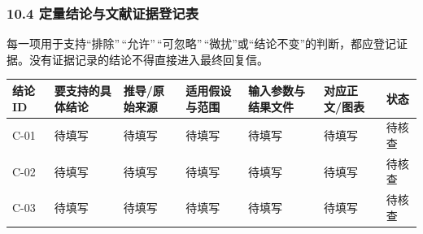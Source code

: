 \documentclass[
  chinese,
  UTF8]{ctexart}
\newcounter{none} %
\begin{document}
\subsubsection{10.4
定量结论与文献证据登记表}\label{ux5b9aux91cfux7ed3ux8bbaux4e0eux6587ux732eux8bc1ux636eux767bux8bb0ux8868}

每一项用于支持``排除''\,``允许''\,``可忽略''\,``微扰''或``结论不变''的判断，都应登记证据。没有证据记录的结论不得直接进入最终回复信。

{\def\LTcaptype{none} %
\begin{longtable}[]{@{}
  >{\raggedright\arraybackslash}p{}
  >{\raggedright\arraybackslash}p{}
  >{\raggedright\arraybackslash}p{}
  >{\raggedright\arraybackslash}p{}
  >{\raggedright\arraybackslash}p{}
  >{\raggedright\arraybackslash}p{}
  >{\raggedright\arraybackslash}p{}@{}}
\toprule\noalign{}
\begin{minipage}[b]{\linewidth}\raggedright
结论 ID
\end{minipage} & \begin{minipage}[b]{\linewidth}\raggedright
要支持的具体结论
\end{minipage} & \begin{minipage}[b]{\linewidth}\raggedright
推导/原始来源
\end{minipage} & \begin{minipage}[b]{\linewidth}\raggedright
适用假设与范围
\end{minipage} & \begin{minipage}[b]{\linewidth}\raggedright
输入参数与结果文件
\end{minipage} & \begin{minipage}[b]{\linewidth}\raggedright
对应正文/图表
\end{minipage} & \begin{minipage}[b]{\linewidth}\raggedright
状态
\end{minipage} \\
\midrule\noalign{}
\endhead
\bottomrule\noalign{}
\endlastfoot
C-01 & 待填写 & 待填写 & 待填写 & 待填写 & 待填写 & 待核查 \\
C-02 & 待填写 & 待填写 & 待填写 & 待填写 & 待填写 & 待核查 \\
C-03 & 待填写 & 待填写 & 待填写 & 待填写 & 待填写 & 待核查 \\
\end{longtable}
}
\end{document}
